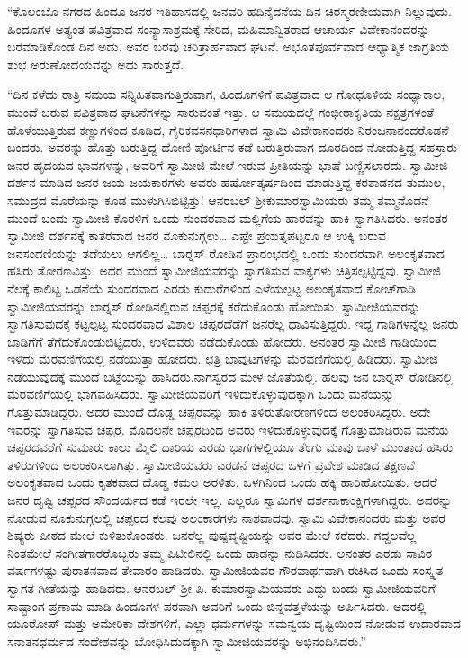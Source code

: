  “ಕೊಲಂಬೊ ನಗರದ ಹಿಂದೂ ಜನರ ಇತಿಹಾಸದಲ್ಲಿ ಜನವರಿ ಹದಿನೈದನೆಯ ದಿನ ಚಿರಸ್ಮರಣೀಯವಾಗಿ ನಿಲ್ಲುವುದು. ಹಿಂದೂಗಳ ಅತ್ಯಂತ ಪವಿತ್ರವಾದ ಸಂನ್ಯಾಸಾಶ್ರಮಕ್ಕೆ ಸೇರಿದ, ಮಹಿಮಾನ್ವಿತರಾದ ಆಚಾರ್ಯ ವಿವೇಕಾನಂದರನ್ನು ಬರಮಾಡಿಕೊಂಡ ದಿನ ಅದು. ಅವರ ಬರವು ಚರಿತ್ರಾರ್ಹವಾದ ಘಟನೆ. ಅಭೂತಪೂರ್ವವಾದ ಆಧ್ಯಾತ್ಮಿಕ ಜಾಗ್ರತಿಯ ಶುಭ ಅರುಣೋದಯವನ್ನು ಅದು ಸಾರುತ್ತದೆ. 

 “ದಿನ ಕಳೆದು ರಾತ್ರಿ ಸಮಯ ಸನ್ನಿಹಿತವಾಗುತ್ತಿರುವಾಗ, ಹಿಂದೂಗಳಿಗೆ ಪವಿತ್ರವಾದ ಆ ಗೋಧೂಳಿಯ ಸಂಧ್ಯಾಕಾಲ, ಮುಂದೆ ಬರುವ ಪವಿತ್ರವಾದ ಘಟನೆಗಳನ್ನು ಸಾರುವಂತೆ ಇತ್ತು. ಆ ಸಮಯದಲ್ಲೆ ಗಂಭೀರಾಕೃತಿಯ ನಕ್ಷತ್ರಗಳಂತೆ ಹೊಳೆಯುತ್ತಿರುವ ಕಣ್ಣುಗಳಿಂದ ಕೂಡಿದ, ಗೈರಿಕವಸನಧಾರಿಗಳಾದ ಸ್ವಾಮಿ ವಿವೇಕಾನಂದರು ನಿರಂಜನಾನಂದರೊಡನೆ ಬಂದರು. ಅವರನ್ನು ಹೊತ್ತು ಬರುತ್ತಿದ್ದ ದೋಣಿ ಪೋರ್ಟಿನ ಕಡೆ ಬರುತ್ತಿರುವಾಗ ದೂರದಿಂದ ನೋಡುತ್ತಿದ್ದ ಸಹಸ್ರಾರು ಜನರ ಹೃದಯದ ಭಾವಗಳನ್ನು, ಅವರಿಗೆ ಸ್ವಾಮೀಜಿ ಮೇಲೆ ಇರುವ ಪ್ರೀತಿಯನ್ನು ಭಾಷೆ ಬಣ್ಣಿಸಲಾರದು. ಸ್ವಾಮೀಜಿ ದರ್ಶನ ಮಾಡಿದ ಜನರ ಜಯ ಜಯಕಾರಗಳು ಅವರು ಹರ್ಷೋತ್ಕರ್ಷದಿಂದ ಮಾಡುತ್ತಿದ್ದ ಕರತಾಡನದ ತುಮುಲ, ಸಮುದ್ರದ ಮೊರೆಯನ್ನು ಕೂಡ ಮುಳುಗಿಸಿಬಿಟ್ಟಿತ್ತು! ಆನರಬಲ್ ಶ‍್ರೀಕುಮಾರಸ್ವಾಮಿಯರು ತಮ್ಮ ತಮ್ಮನೊಡನೆ ಮುಂದೆ ಬಂದು ಸ್ವಾಮೀಜಿ ಕೊರಳಿಗೆ ಒಂದು ಸುಂದರವಾದ ಮಲ್ಲಿಗೆಯ ಹಾರವನ್ನು ಹಾಕಿ ಸ್ವಾಗತಿಸಿದರು. ಅನಂತರ ಸ್ವಾಮೀಜಿ ದರ್ಶನಕ್ಕೆ ಕಾತರವಾದ ಜನರ ನೂಕುನುಗ್ಗಲು… ಎಷ್ಟೇ ಪ್ರಯತ್ನಪಟ್ಟರೂ ಆ ಉಕ್ಕಿ ಬರುವ ಜನಸಂದಣಿಯನ್ನು ತಡೆಯಲು ಆಗಲಿಲ್ಲ… ಬಾರ್‍ನಸ್ ರೋಡಿನ ಪ್ರಾರಂಭದಲ್ಲಿ ಒಂದು ಸುಂದರವಾಗಿ ಅಲಂಕೃತವಾದ ಹಸಿರು ತೋರಣವಿತ್ತು. ಅದರ ಮುಂದೆ ಸ್ವಾಮೀಜಿಯವರನ್ನು ಸ್ವಾಗತಿಸುವ ವಾಕ್ಯಗಳು ಚಿತ್ರಿಸಲ್ಪಟ್ಟಿದ್ದವು. ಸ್ವಾಮೀಜಿ ನೆಲಕ್ಕೆ ಕಾಲಿಟ್ಟ ಒಡನೆಯೆ ಸುಂದರವಾದ ಎರಡು ಕುದುರೆಗಳಿಂದ ಎಳೆಯಲ್ಪಟ್ಟ ಅಲಂಕೃತವಾದ ಕೋಚ್‍ಗಾಡಿ ಸ್ವಾಮೀಜಿಯವರನ್ನು ಬಾರ್‍ನಸ್ ರೋಡಿನಲ್ಲಿರುವ ಚಪ್ಪರಕ್ಕೆ ಕರೆದುಕೊಂಡು ಹೋಯಿತು. ಸ್ವಾಮೀಜಿಯವರನ್ನು ಸ್ವಾಗತಿಸುವುದಕ್ಕೆ ಕಟ್ಟಲ್ಪಟ್ಟ ಸುಂದರವಾದ ವಿಶಾಲ ಚಪ್ಪರದೆಡೆಗೆ ಜನರೆಲ್ಲ ಧಾವಿಸುತ್ತಿದ್ದರು. ಇದ್ದ ಗಾಡಿಗಳನ್ನೆಲ್ಲ ಜನರು ಬಾಡಿಗೆಗೆ ತೆಗೆದುಕೊಂಡುಬಿಟ್ಟಿದರು, ಉಳಿದವರು ನಡೆದುಕೊಂಡು ಹೋದರು. ಅನಂತರ ಸ್ವಾಮೀಜಿ ಗಾಡಿಯಿಂದ ಇಳಿದು ಮೆರವಣಿಗೆಯಲ್ಲಿ ನಡೆಯುತ್ತಾ ಹೋದರು. ಛತ್ರಿ ಬಾವುಟಗಳನ್ನು ಮೆರವಣಿಗೆಯಲ್ಲಿ ಹಿಡಿದರು. ಸ್ವಾಮೀಜಿ ನಡೆಯುವುದಕ್ಕೆ ಮುಂದೆ ಬಟ್ಟೆಯನ್ನು ಹಾಸಿದರು.\break ನಾಗಸ್ವರದ ಮೇಳ ಜೊತೆಯಲ್ಲಿ. ಹಲವು ಜನ ಬಾರ್‍ನಸ್ ರೋಡಿನಲ್ಲಿ ಮೆರವಣಿಗೆಯಲ್ಲಿ ಭಾಗವಹಿಸಿದರು. ಸ್ವಾಮೀಜಿಯವರಿಗೆ ಇಳಿದುಕೊಳ್ಳುವುದಕ್ಕಾಗಿ ಒಂದು ಮನೆಯನ್ನು ಗೊತ್ತುಮಾಡಿದ್ದರು. ಅದರ ಮುಂದೆ ದೊಡ್ಡ ಚಪ್ಪರವನ್ನು ಹಾಕಿ ತಳಿರು\break ತೋರಣಗಳಿಂದ ಅಲಂಕರಿಸಿದ್ದರು. ಅದೇ ಇವರನ್ನು ಸ್ವಾಗತಿಸುವ ಚಪ್ಪರ. ಮೊದಲನೇ ಚಪ್ಪರದಿಂದ ಅವರು ಇಳಿದುಕೊಳ್ಳುವುದಕ್ಕೆ ಗೊತ್ತುಮಾಡಿರುವ ಮನೆಯ ಚಪ್ಪರದವರೆಗೆ ಸುಮಾರು ಕಾಲು ಮೈಲಿ ದಾರಿಯ ಎರಡು ಭಾಗಗಳಲ್ಲಿಯೂ ತೆಂಗು ಮಾವು ಬಾಳೆ ಮುಂತಾದ ಹಸಿರು ತಳಿರುಗಳಿಂದ ಅಲಂಕರಿಸಲಾಗಿತ್ತು. ಸ್ವಾಮೀಜಿಯವರು ಎರಡನೆ ಚಪ್ಪರದ ಒಳಗೆ ಪ್ರವೇಶ ಮಾಡಿದ ತಕ್ಷಣವೆ ಅಲಂಕೃತವಾದ ಒಂದು ಕೃತಕವಾದ ದೊಡ್ಡ ಕಮಲ ಅರಳಿತು. ಒಳಗಿನಿಂದ ಒಂದು ಹಕ್ಕಿ ಹಾರಿಹೋಯಿತು. ಆದರೆ ಜನರ ದೃಷ್ಟಿ ಚಪ್ಪರದ ಸೌಂದರ್ಯದ ಕಡೆ ಇರಲೇ ಇಲ್ಲ. ಎಲ್ಲರೂ ಸ್ವಾಮಿಗಳ ದರ್ಶನಾಕಾಂಕ್ಷಿಗಳಾಗಿದ್ದರು. ಅವರನ್ನು ನೋಡುವ ನೂಕುನುಗ್ಗಲಲ್ಲಿ ಚಪ್ಪರದ ಕೆಲವು ಅಲಂಕಾರಗಳು ನಾಶವಾದವು. ಸ್ವಾಮಿ ವಿವೇಕಾನಂದರು ಮತ್ತು ಅವರ ಶಿಷ್ಯರು ಪೀಠದ ಮೇಲೆ ಕುಳಿತುಕೊಂಡರು. ಜನರೆಲ್ಲ ಪುಷ್ಪವೃಷ್ಟಿಯನ್ನು ಅವರ ಮೇಲೆ ಕರೆದರು. ಗದ್ದಲವೆಲ್ಲ ನಿಂತಮೇಲೆ ಸಂಗೀತಗಾರರೊಬ್ಬರು ತಮ್ಮ ಪಿಟೀಲಿನಲ್ಲಿ ಒಂದು ಹಾಡನ್ನು ನುಡಿಸಿದರು. ಅನಂತರ ಎರಡು ಸಾವಿರ ವರ್ಷಗಳಷ್ಟು ಪುರಾತನವಾದ ತೇವಾರಂ ಹಾಡಿದರು. ಸ್ವಾಮೀಜಿಯವರ ಗೌರವಾರ್ಥವಾಗಿ ರಚಿಸಿದ ಒಂದು ಸಂಸ್ಕೃತ ಸ್ವಾಗತ ಗೀತೆಯನ್ನು ಹಾಡಿದರು. ಆನರಬಲ್ ಶ‍್ರೀ ಪಿ. ಕುಮಾರಸ್ವಾಮಿಯವರು ಎದ್ದು ಬಂದು ಸ್ವಾಮೀಜಿಯವರಿಗೆ ಸಾಷ್ಟಾಂಗ ಪ್ರಣಾಮ ಮಾಡಿ ಹಿಂದೂಗಳ ಪರವಾಗಿ ಅವರಿಗೆ ಒಂದು ಬಿನ್ನವತ್ತಳೆಯನ್ನು ಅರ್ಪಿಸಿದರು. ಅದರಲ್ಲಿ ಯೂರೋಪ್ ಮತ್ತು ಅಮೇರಿಕಾ ದೇಶಗಳಿಗೆ, ಎಲ್ಲಾ ಧರ್ಮಗಳನ್ನು ಸಮನ್ವಯ ದೃಷ್ಟಿಯಿಂದ ನೋಡುವ ಉದಾರವಾದ ಸನಾತನಧರ್ಮದ ಸಂದೇಶವನ್ನು ಬೋಧಿಸಿದುದಕ್ಕಾಗಿ ಸ್ವಾಮೀಜಿಯವರನ್ನು ಅಭಿನಂದಿಸಿದರು.” 

